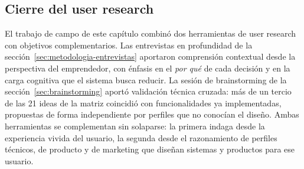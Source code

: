\subsection{Cierre del user research}
\label{sec:brainstorming-cierre}

El trabajo de campo de este capítulo combinó dos herramientas de user research con objetivos complementarios. Las entrevistas en profundidad de la sección~\ref{sec:metodologia-entrevistas} aportaron comprensión contextual desde la perspectiva del emprendedor, con énfasis en el \emph{por qué} de cada decisión y en la carga cognitiva que el sistema busca reducir. La sesión de brainstorming de la sección~\ref{sec:brainstorming} aportó validación técnica cruzada: más de un tercio de las 21 ideas de la matriz coincidió con funcionalidades ya implementadas, propuestas de forma independiente por perfiles que no conocían el diseño. Ambas herramientas se complementan sin solaparse: la primera indaga desde la experiencia vivida del usuario, la segunda desde el razonamiento de perfiles técnicos, de producto y de marketing que diseñan sistemas y productos para ese usuario.
